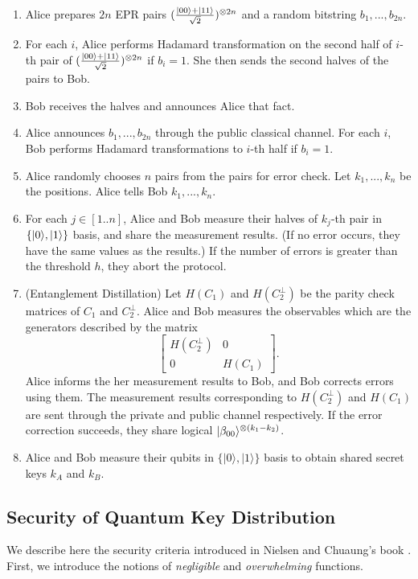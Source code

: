 \begin{enumerate}
\item Alice prepares $2n$ EPR pairs
      $(\frac{|00\rangle+|11\rangle}{\sqrt{2}})^{\otimes 2n}$ and 
      a random bitstring $b_{1},...,b_{2n}$. 
\item For each $i$, Alice performs Hadamard 
      transformation on the second half of 
      $i$-th pair of $(\frac{|00\rangle+|11\rangle}{\sqrt{2}})^{\otimes 2n}$
      if $b_i = 1$.
      She then sends the second halves of the pairs to Bob.
\item Bob receives the halves and announces Alice that fact.
\item Alice announces $b_1,...,b_{2n}$
      through the public classical channel. For each $i$, Bob
      performs Hadamard transformations to $i$-th half if
      $b_i = 1$. 
\item Alice randomly chooses $n$ pairs from the pairs
      for error check. Let $k_1,...,k_n$ be the positions.
      Alice tells Bob $k_1,...,k_n$.
\item For each $j \in [1..n]$, 
      Alice and Bob measure their halves of $k_j$-th pair in
      $\{|0\rangle,|1\rangle\}$ basis,
      and share the measurement results. (If no error occurs, they
      have the same values as the results.)
      If the number of errors is greater than the threshold $h$, 
      they abort the protocol.
\item (Entanglement Distillation)
      Let $H(C_1)$ and $H(C_2^\perp)$ be the parity check matrices of 
      $C_1$ and $C^\perp_2$.
      Alice and Bob measures the observables
      which are the generators described by the matrix
      \[
      \begin{bmatrix}
       H(C_2^\perp) & 0\\
       0 & H(C_1)
      \end{bmatrix}.
      \]
      Alice informs the her measurement results to Bob, and
      Bob corrects errors using them. 
      The measurement results corresponding to $H(C_2^\perp)$ and 
      $H(C_1)$ are sent through the private and public channel respectively.
      If the error correction succeeds,
      they share logical $|\beta_{00}\rangle^{\otimes (k_1 - k_2)}$.
\item Alice and Bob measure their qubits in $\{|0\rangle, |1\rangle\}$
      basis to obtain shared secret keys $k_A$ and $k_B$.
\end{enumerate}

\subsection{Security of Quantum Key Distribution}
We describe here the security criteria introduced in Nielsen and Chuaung's
book \cite[Chapter 12]{NielsenChuang-Kimura2004}.
First, we introduce the notions of \emph{negligible} and
\emph{overwhelming} functions.

